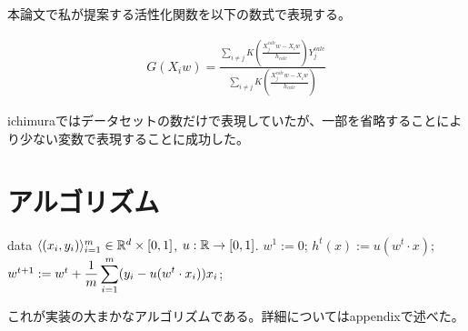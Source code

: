 本論文で私が提案する活性化関数を以下の数式で表現する。


\begin{eqnarray}
G(X_iw)=\frac{\sum_{i\neq j} K\left(\frac{X^{calc}_j w - X_i w}{h_{calc}}\right)Y^{calc}_j}{\sum_{i\neq j} K\left(\frac{X^{calc}_j w - X_i w}{h_{calc}}\right)}
\end{eqnarray}

ichimuraではデータセットの数だけで表現していたが、一部を省略することにより少ない変数で表現することに成功した。


\section{アルゴリズム}


\begin{algorithm}[]
	\caption{\KAF}
	\label{alg:fixed-u-alg}
\begin{algorithmic}
	 data $\langle (x_i, y_i) \rangle_{i=1}^m \in
	\mathbb{R}^d \times [0, 1]$, $u: \mathbb{R} \rightarrow [0, 1]$.
	\STATE $w^1 := 0$;
	\STATE $h^t(x) := u(w^t \cdot x)$;
	\STATE $w^{t+1} := w^t + \displaystyle\frac{1}{m} \sum_{i=1}^m (y_i - u(w^t
	\cdot x_i)) x_i$;
	\ENDFOR
\end{algorithmic}
\end{algorithm}

これが実装の大まかなアルゴリズムである。詳細についてはappendixで述べた。




